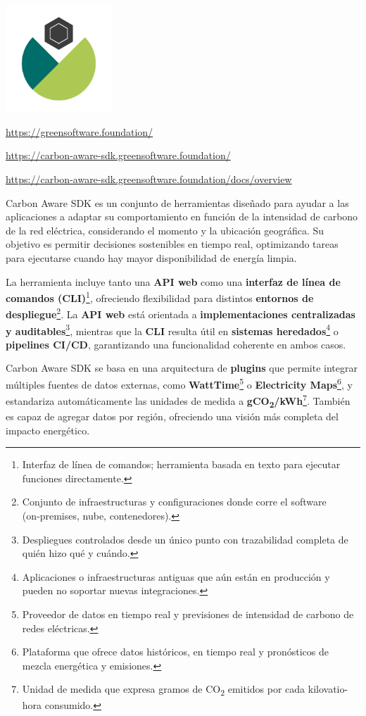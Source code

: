 \documentclass[12pt,a4paper]{report}
\begin{document}
\begin{center}
\includegraphics[width=0.3\textwidth]{imagenes/Carbon_Logo.png}
\end{center}

\href{https://greensoftware.foundation/}{https://greensoftware.foundation/}

\href{https://carbon-aware-sdk.greensoftware.foundation/}{https://carbon-aware-sdk.greensoftware.foundation/}

\href{https://carbon-aware-sdk.greensoftware.foundation/docs/overview}{https://carbon-aware-sdk.greensoftware.foundation/docs/overview}

Carbon Aware SDK es un conjunto de herramientas diseñado para ayudar a las
aplicaciones a adaptar su comportamiento en función de la intensidad de carbono de la red eléctrica, considerando el momento y la ubicación geográfica. Su objetivo es
permitir decisiones sostenibles en tiempo real, optimizando tareas para
ejecutarse cuando hay mayor disponibilidad de energía limpia.

La herramienta incluye tanto una \textbf{API web} como una \textbf{interfaz de línea de comandos
  (CLI)}\footnote{Interfaz de línea de comandos; herramienta basada en texto para
  ejecutar funciones directamente.}, ofreciendo flexibilidad para distintos
\textbf{entornos de despliegue}\footnote{Conjunto de infraestructuras y
  configuraciones donde corre el software (on‑premises, nube, contenedores).}. La
\textbf{API web} está orientada a
\textbf{implementaciones centralizadas y auditables}\footnote{Despliegues
  controlados desde un único punto con trazabilidad completa de quién hizo qué y
  cuándo.}, mientras que la \textbf{CLI} resulta útil
en \textbf{sistemas heredados}\footnote{Aplicaciones o infraestructuras
  antiguas que aún están en producción y pueden no soportar nuevas
  integraciones.} o \textbf{pipelines CI/CD}, garantizando una funcionalidad coherente en ambos casos.

Carbon Aware SDK se basa en una arquitectura de
\textbf{plugins} que permite integrar múltiples fuentes
de datos externas, como \textbf{WattTime}\footnote{Proveedor de datos en tiempo
  real y previsiones de intensidad de carbono de redes eléctricas.} o
\textbf{Electricity Maps}\footnote{Plataforma que ofrece datos históricos, en
  tiempo real y pronósticos de mezcla energética y emisiones.}, y estandariza
automáticamente las unidades de medida a
\textbf{gCO\textsubscript{2}/kWh}\footnote{Unidad de medida que expresa gramos
  de CO\textsubscript{2} emitidos por cada kilovatio-hora consumido.}. También es
capaz de agregar datos por región, ofreciendo una visión más completa del
impacto energético.
\end{document}
